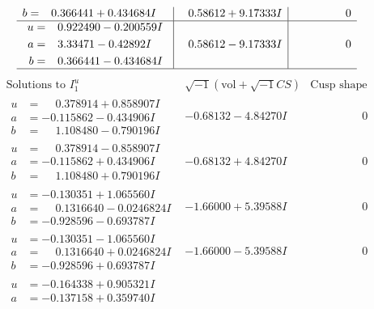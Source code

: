 \documentclass[1p]{elsarticle_modified}
\theoremstyle{definition}
\newcommand{\I}{\sqrt{-1}}
\begin{document}
$$\begin{array}{c|c|c}
\begin{aligned}
b &= \phantom{-}0.366441 + 0.434684 I\end{aligned}
 & \phantom{-}0.58612 + 9.17333 I & \phantom{-0.000000 } 0 \\ \hline\begin{aligned}
u &= \phantom{-}0.922490 - 0.200559 I \\
a &= \phantom{-}3.33471 - 0.42892 I \\
b &= \phantom{-}0.366441 - 0.434684 I\end{aligned}
 & \phantom{-}0.58612 - 9.17333 I & \phantom{-0.000000 } 0\\
 \hline 
 \end{array}$$\newpage$$\begin{array}{c|c|c}  
\text{Solutions to }I^u_{1}& \I (\text{vol} + \sqrt{-1}CS) & \text{Cusp shape}\\
 \hline 
\begin{aligned}
u &= \phantom{-}0.378914 + 0.858907 I \\
a &= -0.115862 - 0.434906 I \\
b &= \phantom{-}1.108480 - 0.790196 I\end{aligned}
 & -0.68132 - 4.84270 I & \phantom{-0.000000 } 0 \\ \hline\begin{aligned}
u &= \phantom{-}0.378914 - 0.858907 I \\
a &= -0.115862 + 0.434906 I \\
b &= \phantom{-}1.108480 + 0.790196 I\end{aligned}
 & -0.68132 + 4.84270 I & \phantom{-0.000000 } 0 \\ \hline\begin{aligned}
u &= -0.130351 + 1.065560 I \\
a &= \phantom{-}0.1316640 - 0.0246824 I \\
b &= -0.928596 - 0.693787 I\end{aligned}
 & -1.66000 + 5.39588 I & \phantom{-0.000000 } 0 \\ \hline\begin{aligned}
u &= -0.130351 - 1.065560 I \\
a &= \phantom{-}0.1316640 + 0.0246824 I \\
b &= -0.928596 + 0.693787 I\end{aligned}
 & -1.66000 - 5.39588 I & \phantom{-0.000000 } 0 \\ \hline\begin{aligned}
u &= -0.164338 + 0.905321 I \\
a &= -0.137158 + 0.359740 I \\

\end{aligned}
\end{array}$$
\end{document}
